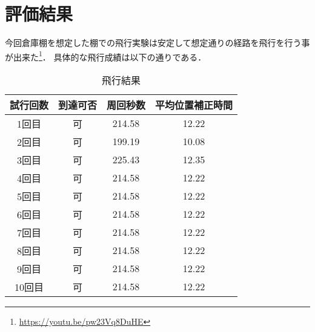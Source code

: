 \section{評価結果}
今回倉庫棚を想定した棚での飛行実験は安定して想定通りの経路を飛行を行う事が出来た\footnote{\url{https://youtu.be/pw23Vq8DuHE}}．
具体的な飛行成績は以下の通りである．

\begin{table}[h]
    \caption{飛行結果}
    \label{table:fly_result}
    \centering
    \begin{tabular}{cccc}
        \hline
        試行回数 & 到達可否 & 周回秒数 & 平均位置補正時間 \\
        \hline \hline
        1回目 & 可 & 214.58 & 12.22 \\
        2回目 & 可 & 199.19 & 10.08 \\
        3回目 & 可 & 225.43 & 12.35 \\
        
        4回目 & 可 & 214.58 & 12.22 \\
        5回目 & 可 & 214.58 & 12.22 \\
        6回目 & 可 & 214.58 & 12.22 \\
        7回目 & 可 & 214.58 & 12.22 \\
        8回目 & 可 & 214.58 & 12.22 \\
        9回目 & 可 & 214.58 & 12.22 \\
        10回目 & 可 & 214.58 & 12.22 \\
        \hline
    \end{tabular}
\end{table}